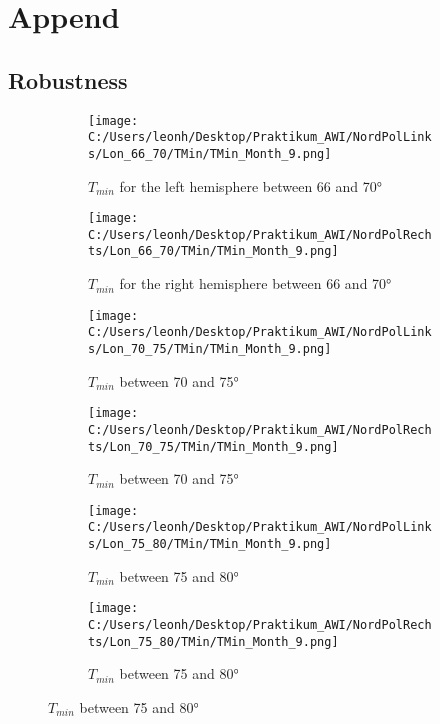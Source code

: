 \chapter{Append}
\label{AppChap:Robustness}

\section{Robustness}

\begin{figure}[ht]
    \centering
    \begin{subfigure}{0.48\textwidth}
        \centering
        \texttt{[image: C:/Users/leonh/Desktop/Praktikum\_AWI/NordPolLinks/Lon\_66\_70/TMin/TMin\_Month\_9.png]}
        \caption{$T_{min}$ for the left hemisphere between 66 and 70°}
    \end{subfigure}
    \begin{subfigure}{0.48\textwidth}
        \centering
        \texttt{[image: C:/Users/leonh/Desktop/Praktikum\_AWI/NordPolRechts/Lon\_66\_70/TMin/TMin\_Month\_9.png]}
        \caption{$T_{min}$ for the right hemisphere between 66 and 70°}
    \end{subfigure}
    
    \begin{subfigure}{0.48\textwidth}
        \centering
        \texttt{[image: C:/Users/leonh/Desktop/Praktikum\_AWI/NordPolLinks/Lon\_70\_75/TMin/TMin\_Month\_9.png]}
        \caption{$T_{min}$ between 70 and 75°}
    \end{subfigure}
    \begin{subfigure}{0.48\textwidth}
        \centering
        \texttt{[image: C:/Users/leonh/Desktop/Praktikum\_AWI/NordPolRechts/Lon\_70\_75/TMin/TMin\_Month\_9.png]}
        \caption{$T_{min}$ between 70 and 75°}
    \end{subfigure}

        
    \begin{subfigure}{0.48\textwidth}
        \centering
        \texttt{[image: C:/Users/leonh/Desktop/Praktikum\_AWI/NordPolLinks/Lon\_75\_80/TMin/TMin\_Month\_9.png]}
        \caption{$T_{min}$ between 75 and 80°}
    \end{subfigure}
    \begin{subfigure}{0.48\textwidth}
        \centering
        \texttt{[image: C:/Users/leonh/Desktop/Praktikum\_AWI/NordPolRechts/Lon\_75\_80/TMin/TMin\_Month\_9.png]}
        \caption{$T_{min}$ between 75 and 80°}
    \end{subfigure}


\end{figure}

